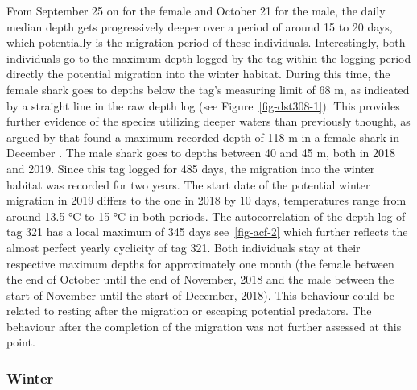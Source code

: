 \documentclass[
  authoryear,
  review,
  3p]{elsarticle}
\begin{document}
From September 25 on for the female and October 21 for the male, the
daily median depth gets progressively deeper over a period of around 15
to 20 days, which potentially is the migration period of these
individuals. Interestingly, both individuals go to the maximum depth
logged by the tag within the logging period directly the potential
migration into the winter habitat. During this time, the female shark
goes to depths below the tag's measuring limit of 68 m, as indicated by
a straight line in the raw depth log (see Figure~\ref{fig-dst308-1}).
This provides further evidence of the species utilizing deeper waters
than previously thought, as argued by \citet{griffiths_2020} that found
a maximum recorded depth of 118 m in a female shark in December
\citep[S4]{griffiths_2020}. The male shark goes to depths between 40 and
45 m, both in 2018 and 2019. Since this tag logged for 485 days, the
migration into the winter habitat was recorded for two years. The start
date of the potential winter migration in 2019 differs to the one in
2018 by 10 days, temperatures range from around 13.5 °C to 15 °C in both
periods. The autocorrelation of the depth log of tag 321 has a local
maximum of 345 days see~\ref{fig-acf-2} which further reflects the
almost perfect yearly cyclicity of tag 321. Both individuals stay at
their respective maximum depths for approximately one month (the female
between the end of October until the end of November, 2018 and the male
between the start of November until the start of December, 2018). This
behaviour could be related to resting after the migration or escaping
potential predators. The behaviour after the completion of the migration
was not further assessed at this point.

\hypertarget{sec-disc-winter}{%
\subsubsection{Winter}\label{sec-disc-winter}}
\end{document}
